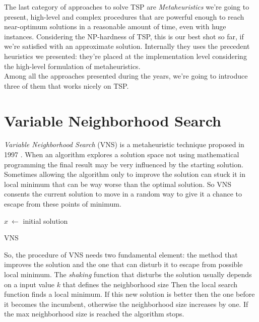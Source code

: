 The last category of approaches to solve TSP are \emph{Metaheuristics} we're
going to present, high-level and complex procedures that are powerful enough to
reach near-optimum solutions in a reasonable amount of time, even with huge
instances. Considering the NP-hardness of TSP, this is our best shot so far, if
we're satisfied with an approximate solution. Internally they uses the
precedent heuristics we presented: they're placed at the implementation level
considering the high-level formulation of metaheuristics.\\ Among all the
approaches presented during the years, we're going to introduce three of them that
works nicely on TSP.

\section{Variable Neighborhood Search}
\emph{Variable Neighborhood Search} (VNS) is a metaheuristic technique proposed in
1997 \citep{mladenovic1997variable}. When an algorithm explores a solution space
not using mathematical programming the final result may be very influenced by
the starting solution. Sometimes allowing the algorithm only to improve the
solution can stuck it in local minimum that can be way worse than the optimal
solution. So VNS consents the current solution to move in a random way to
give it a chance to escape from these points of minimum.\\

\begin{algorithm}[H]
\SetAlgoLined
{}
    $x\ \leftarrow$ initial solution\;
    \caption{VNS}
\end{algorithm}

So, the procedure of VNS needs two fundamental element: the method that
improves the solution and the one that can disturb it to escape from possible
local minimum. The \emph{shaking} function that disturbs the solution usually
depends on a input value $k$ that defines the neighborhood size Then the local
search function finds a local minimum. If this new solution is better then the
one before it becomes the incumbent, otherwise the neighborhood size increases
by one. If the max neighborhood size is reached the algorithm stops.

